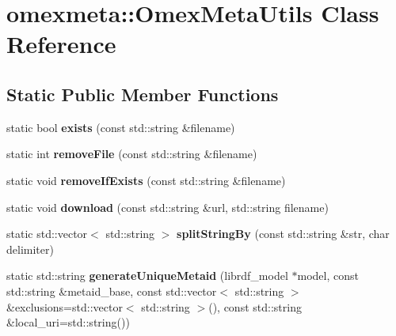 \hypertarget{classomexmeta_1_1OmexMetaUtils}{}\section{omexmeta\+:\+:Omex\+Meta\+Utils Class Reference}
\label{classomexmeta_1_1OmexMetaUtils}
\subsection*{Static Public Member Functions}
\begin{DoxyCompactItemize}
\item 
\mbox{\label{classomexmeta_1_1OmexMetaUtils_ab72b362607e6bbdd0025eefa574cd073}} 
static bool {\bfseries exists} (const std\+::string \&filename)
\item 
\mbox{\label{classomexmeta_1_1OmexMetaUtils_a9c445a8e0cc6589b25d6fa630686c171}} 
static int {\bfseries remove\+File} (const std\+::string \&filename)
\item 
\mbox{\label{classomexmeta_1_1OmexMetaUtils_a8e629136cb2685ed839ea3a0e88094e6}} 
static void {\bfseries remove\+If\+Exists} (const std\+::string \&filename)
\item 
\mbox{\label{classomexmeta_1_1OmexMetaUtils_a046b603d6308242b70b55de6cb72325c}} 
static void {\bfseries download} (const std\+::string \&url, std\+::string filename)
\item 
\mbox{\label{classomexmeta_1_1OmexMetaUtils_aac769ce6e901f32820cd7dc3fef989fa}} 
static std\+::vector$<$ std\+::string $>$ {\bfseries split\+String\+By} (const std\+::string \&str, char delimiter)
\item 
\mbox{\label{classomexmeta_1_1OmexMetaUtils_acfb264163cf86ef1171d3c2b826eefb9}} 
static std\+::string {\bfseries generate\+Unique\+Metaid} (librdf\+\_\+model $\ast$model, const std\+::string \&metaid\+\_\+base, const std\+::vector$<$ std\+::string $>$ \&exclusions=std\+::vector$<$ std\+::string $>$(), const std\+::string \&local\+\_\+uri=std\+::string())
\item 

\end{DoxyCompactItemize}
